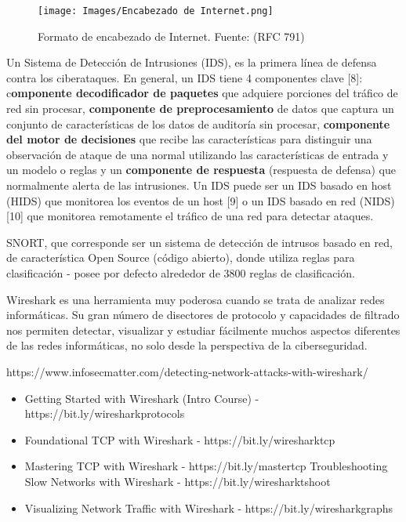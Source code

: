 \begin{figure}[H]
    \centering
    \texttt{[image: Images/Encabezado de Internet.png]}
    \caption{Formato de encabezado de Internet.
    Fuente: \cite{postel_internet_nodate} (RFC 791)}
    \label{fig:EncabezadoIPV4}
\end{figure}
\color{black}



Un Sistema de Detección de Intrusiones (IDS), es la primera línea de defensa contra los ciberataques. En general, un IDS tiene 4 componentes clave [8]: c\textbf{omponente decodificador de paquetes }que adquiere porciones del tráfico de red sin procesar, \textbf{componente de preprocesamiento} de datos que captura un conjunto de características de los datos de auditoría sin procesar, \textbf{componente del motor de decisiones} que recibe las características para distinguir una observación de ataque de una normal utilizando las características de entrada y un modelo o reglas y un \textbf{componente de respuesta} (respuesta de defensa) que normalmente alerta de las intrusiones. Un IDS puede ser un IDS basado en host (HIDS) que monitorea los eventos de un host [9] o un IDS basado en red (NIDS) [10] que monitorea remotamente el tráfico de una red para detectar ataques.

SNORT, que corresponde ser un sistema de detección de intrusos basado en red, de característica Open Source (código abierto), donde utiliza reglas para clasificación - posee por defecto alrededor de 3800 reglas de clasificación. 


Wireshark es una herramienta muy poderosa cuando se trata de analizar redes informáticas. Su gran número de disectores de protocolo y capacidades de filtrado nos permiten detectar, visualizar y estudiar fácilmente muchos aspectos diferentes de las redes informáticas, no solo desde la perspectiva de la ciberseguridad.

https://www.infosecmatter.com/detecting-network-attacks-with-wireshark/
\begin{itemize}
\item Getting Started with Wireshark (Intro Course) - https://bit.ly/wiresharkprotocols
\item Foundational TCP with Wireshark - https://bit.ly/wiresharktcp
\item Mastering TCP with Wireshark - https://bit.ly/mastertcp
Troubleshooting Slow Networks with Wireshark - https://bit.ly/wiresharktshoot
\item Visualizing Network Traffic with Wireshark - https://bit.ly/wiresharkgraphs
\end{itemize}
